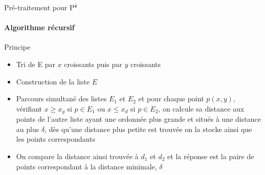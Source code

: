 \documentclass[aspectratio=1610,francais,envcountsect]{beamer}
\begin{document}
\begin{frame}[allowframebreaks]{Pré-traitement pour P$^\mathsf{4}$
    \insertcontinuationtext}
  \framesubtitle{Algorithme récursif}

  \begin{alertblock}{Principe}
    \begin{itemize}
    \item Tri de E par $x$ croissants puis par $y$ croissants
    \item Construction de la liste $E$
    \item Parcours simultané des listes $E_1$ et $E_2$ et pour chaque
      point $p (x, y)$, vérifiant $x \geq x_g$ si $p \in E_1$ ou
      $x \leq x_d$ si $p \in E_2$, on calcule sa distance aux points
      de l’autre liste ayant une ordonnée plus grande et situés à une
      distance au plus $\delta$, dès qu’une distance plus petite est
      trouvée on la stocke ainsi que les points correspondants
    \item On compare la distance ainsi trouvée à $d_1$ et $d_2$ et la
      réponse est la paire de points correspondant à la distance
      minimale, $\delta$
    \end{itemize}
  \end{alertblock}
  
  \vfill
 
  \bigskip
  
  \begin{algorithm}[H]
    \scriptsize \DontPrintSemicolon {}
     
  \end{algorithm}
\end{frame}
\end{document}
